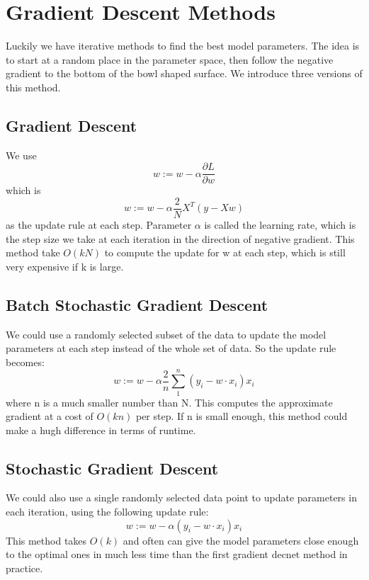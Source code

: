 \section{Gradient Descent Methods}
Luckily we have iterative methods to find the best model parameters. The idea is to start at a random place in the parameter space, then follow the negative gradient to the bottom of the bowl shaped surface. We introduce three versions of this method. 

\subsection{Gradient Descent}
We use $$w := w - \alpha\frac{\partial L}{\partial w}$$
which is $$w := w - \alpha\frac{2}{N}X^T(y-Xw)$$ as the update rule at each step. Parameter $\alpha$ is called the learning rate, which is the step size we take at each iteration in the direction of negative gradient. This method take $O(kN)$ to compute the update for w at each step, which is still very expensive if k is large.

\subsection{Batch Stochastic Gradient Descent}
We could use a randomly selected subset of the data to update the model parameters at each step instead of the whole set of data. So the update rule becomes: 
$$w := w - \alpha\frac{2}{n}\sum_{1}^{n}(y_i - w \cdot x_i)x_i$$ 
where n is a much smaller number than N. This computes the approximate gradient at a cost of $O(kn)$ per step. If n is small enough, this method could make a hugh difference in terms of runtime.

\subsection{Stochastic Gradient Descent}
We could also use a single randomly selected data point to update parameters in each iteration, using the following update rule:
$$w := w - \alpha(y_i - w \cdot x_i)x_i$$ 
This method takes $O(k)$ and often can give the model parameters close enough to the optimal ones in much less time than the first gradient decnet method in practice.